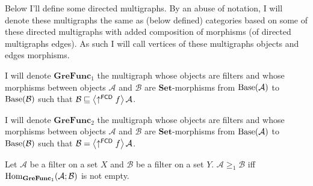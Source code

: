 Below I'll define some directed multigraphs. By an abuse of notation,
I will denote these multigraphs the same as (below defined) categories
based on some of these directed multigraphs with added composition
of morphisms (of directed multigraphs edges). As such I will call
vertices of these multigraphs objects and edges morphisms.
\begin{defn}
I will denote $\mathbf{GreFunc}{}_{1}$ the multigraph whose objects
are filters and whose morphisms between objects $\mathcal{A}$ and
$\mathcal{B}$ are $\mathbf{Set}$-morphisms from $\operatorname{Base}(\mathcal{A})$
to $\operatorname{Base}(\mathcal{B})$ such that $\mathcal{B}\sqsubseteq\left\langle \uparrow^{\mathsf{FCD}}f\right\rangle\mathcal{A}$.
\end{defn}

\begin{defn}
I will denote $\mathbf{GreFunc}{}_{2}$ the multigraph whose objects
are filters and whose morphisms between objects $\mathcal{A}$ and
$\mathcal{B}$ are $\mathbf{Set}$-morphisms from $\operatorname{Base}(\mathcal{A})$
to $\operatorname{Base}(\mathcal{B})$ such that $\mathcal{B}=\left\langle \uparrow^{\mathsf{FCD}}f\right\rangle\mathcal{A}$.
\end{defn}

\begin{defn}
Let $\mathcal{A}$ be a filter on a set $X$ and $\mathcal{B}$ be
a filter on a set $Y$. $\mathcal{A}\ge_{1}\mathcal{B}$ iff $\operatorname{Hom}_{\mathbf{GreFunc}_{1}}(\mathcal{A};\mathcal{B})$
is not empty.
\end{defn}

